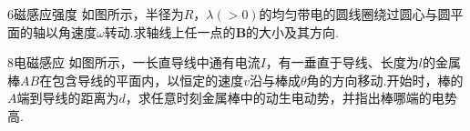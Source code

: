 \hspace{-2.16em}
\begin{minipage}{0.67\textwidth}
    \begin{exercise}{6}{磁感应强度}
        如图所示，半径为$R$，$\lambda(>0)$的均匀带电的圆线圈绕过圆心与圆平面的轴以角速度$\omega$转动.求轴线上任一点的$\boldsymbol{B}$的大小及其方向.
    \end{exercise}
\end{minipage}
\hfill
\begin{minipage}[c]{0.33\textwidth}
\begin{center}
    \begin{tikzpicture}
    
    \end{tikzpicture}
\end{center}
\end{minipage}

\hspace{-2.16em}
\begin{minipage}{0.67\textwidth}
    \begin{exercise}{8}{电磁感应}
        如图所示，一长直导线中通有电流$I$，有一垂直于导线、长度为$l$的金属棒$AB$在包含导线的平面内，以恒定的速度$v$沿与棒成$\theta$角的方向移动.开始时，棒的$A$端到导线的距离为$d$，求任意时刻金属棒中的动生电动势，并指出棒哪端的电势高.
    \end{exercise}
\end{minipage}
\hfill
\begin{minipage}[c]{0.33\textwidth}
\begin{center}
    \begin{tikzpicture}
    
    \end{tikzpicture}
\end{center}
\end{minipage}